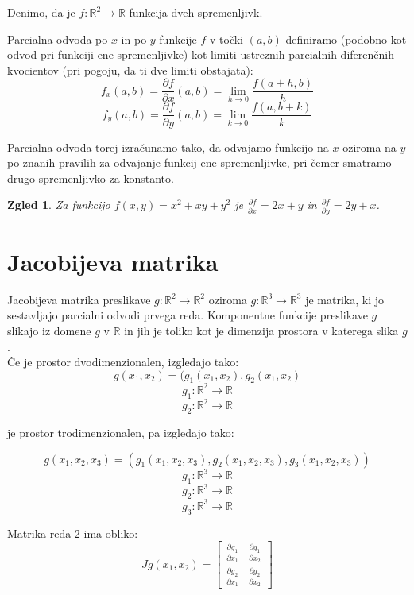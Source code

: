 \documentclass[12pt, a4paper]{article}
\newtheorem{zgled}{Zgled}
\begin{document}

Denimo, da je $f : \mathbb{R}^2 \rightarrow \mathbb{R} $ funkcija dveh spremenljivk.

Parcialna odvoda po $x$ in po $y$ funkcije $f$ v točki $(a, b)$ definiramo (podobno kot odvod pri funkciji ene spremenljivke) kot limiti ustreznih parcialnih diferenčnih kvocientov (pri pogoju, da ti dve limiti obstajata):
$$
f_x(a, b)= \frac{\partial f}{\partial x}(a, b) = \lim_{h\to0} \frac{f(a+h, b)}{h}
$$
$$
f_y(a, b)= \frac{\partial f}{\partial y}(a, b) = \lim_{k\to0} \frac{f(a, b+k)}{k}
$$

Parcialna odvoda torej izračunamo tako, da odvajamo funkcijo na $x$ oziroma na $y$ po znanih pravilih za odvajanje funkcij ene spremenljivke, pri čemer smatramo drugo spremenljivko za konstanto.

\begin{zgled}

Za funkcijo $f(x, y)= x^2+xy+y^2$ je $\frac{\partial f}{\partial x}= 2x+y$ in $\frac{\partial f}{\partial y}= 2y+x$.

\end{zgled}

\section{Jacobijeva matrika}
Jacobijeva matrika preslikave $g: \mathbb{R}^2 \rightarrow \mathbb{R}^2$ oziroma $g: \mathbb{R}^3 \rightarrow \mathbb{R}^3$ je matrika, ki jo sestavljajo parcialni odvodi prvega reda.
Komponentne funkcije preslikave $g$ slikajo iz domene $g$ v $\mathbb{R}$ in jih je toliko kot je dimenzija prostora v katerega slika $g$.\\
Če je prostor dvodimenzionalen, izgledajo tako:
$$g(x_1, x_2)=(g_1(x_1, x_2), g_2(x_1, x_2) $$
$$g_1: \mathbb{R}^2 \rightarrow \mathbb{R}$$ 
$$g_2: \mathbb{R}^2 \rightarrow \mathbb{R}$$

 je prostor trodimenzionalen, pa izgledajo tako:

$$g(x_1, x_2, x_3)=(g_1(x_1, x_2, x_3), g_2(x_1, x_2, x_3), g_3(x_1, x_2, x_3))$$
$$g_1: \mathbb{R}^3 \rightarrow \mathbb{R}$$  
$$g_2: \mathbb{R}^3 \rightarrow \mathbb{R}$$ 
$$g_3: \mathbb{R}^3 \rightarrow \mathbb{R}$$

Matrika reda 2 ima obliko:
$$
Jg(x_1,x_2)=
\begin{bmatrix}
\frac{\partial g_1}{\partial x_1} & \frac{\partial g_1}{\partial x_2}  \\
\frac{\partial g_2}{\partial x_1} & \frac{\partial g_2}{\partial x_2} 
\end{bmatrix}
$$
\end{document}
